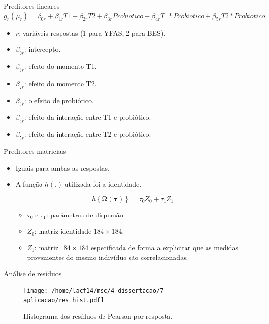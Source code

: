 \documentclass[
  ignorenonframetext,
  serif,
  professionalfont,
  usenames,
  dvipsnames,
  aspectratio = 169]{beamer}
\begin{document}
\begin{frame}{Preditores lineares}
\protect\hypertarget{preditores-lineares}{}
\[
g_{r}(\mu_{r}) = \beta_{0r} + \beta_{1r} T1 + \beta_{2r} T2 + \beta_{3r} Probiotico + \beta_{4r} T1*Probiotico + \beta_{5r} T2*Probiotico
\]

\begin{itemize}
  \item $r$: variáveis respostas (1 para YFAS, 2 para BES). 
  \item $\beta_{0r}$: intercepto.
  \item $\beta_{1r}$: efeito do momento T1.
  \item $\beta_{2r}$: efeito do momento T2.
  \item $\beta_{3r}$: o efeito de probiótico. 
  \item $\beta_{4r}$: efeito da interação entre T1 e probiótico.
  \item $\beta_{5r}$: efeito da interação entre T2 e probiótico.
\end{itemize}
\end{frame}

\begin{frame}{Preditores matriciais}
\protect\hypertarget{preditores-matriciais}{}
\begin{itemize}
  \itemsep 2ex
  
  \item Iguais para ambas as respostas.

  \item A função $h(.)$ utilizada foi a identidade.

$$h\left \{ \boldsymbol{\Omega}(\boldsymbol{\tau}) \right \} = \tau_0Z_0 + \tau_1Z_1$$
  \begin{itemize}
    \item $\tau_0$ e $\tau_1$: parâmetros de dispersão. 
    \item $Z_0$: matriz identidade $184 \times 184$.
    \item $Z_1$: matriz $184 \times 184$ especificada de forma a explicitar que as medidas provenientes do mesmo indivíduo são correlacionadas. 
  \end{itemize}
\end{itemize}
\end{frame}

\begin{frame}{Análise de resíduos}
\protect\hypertarget{anuxe1lise-de-resuxedduos}{}
\begin{figure}[H]
\centering
\texttt{[image: /home/lacf14/msc/4\_dissertacao/7-aplicacao/res\_hist.pdf]}
\caption{Histograma dos resíduos de Pearson por resposta.}
\label{fig:diagnostico1}
\end{figure}
\end{frame}
\end{document}
